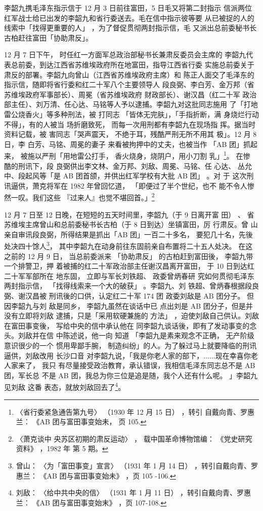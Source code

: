 李韶九携毛泽东指示信于 12 月 3 日前往富田，5 日毛又将第二封指示 信派两位
红军战士给已出发的李韶九和省行委送去。毛在信中指示彼等要 从已被捉的人的
线索中「找得更重要的人」 ，为了督促贯彻两封指示信，毛 又派出总前委秘书长
古柏赶往富田「协助肃反」。

12 月 7 日下午， 时任红一方面军总政治部秘书长兼肃反委员会主席的 李韶九代
表总前委，到达江西省苏维埃政府所在地富田，指导江西省行委 实施总前委关于
肃反的部署。李韶九向曾山（江西省苏维埃政府主席）和 陈正人面交了毛泽东的
指示信，随即将省行委和红二十军八个主要领导人 段良弼、李白芳、金万邦（省
苏维埃政府军事部长）、周冕（省苏维埃政府 财政部长）、谢汉昌（红二十军
政治部主任）、刘万清、任心达、马铭等人予以逮捕。李韶九对这批同志施用
了「打地雷公烧香火」等多种刑法，被 打同志 「皆体无完肤」，「手指折断，满
身烧烂行动不得」，有的人被当 场折磨致死， 而每一次用刑都有李韶九在现场指
挥。据当时资料记载，被 害同志「哭声震天， 不绝于耳，残酷严刑无所不用其
极」。12 月 8 日，李 白芳、马铭、周冕的妻子 来看被拘押中的丈夫，也被当作
「AB 团」抓起来， 被施以严刑「用地雷公打手， 香火烧身，烧阴户，用小刀割
乳」\footnote{ 〈省行委紧急通告第九号〉 （1930 年 12 月 15 日） ，转引
自戴向青、罗惠兰： 《AB 团与富田事变始未， 页 105.}。 在惨 酷的刑讯下，段
良弼供出李文林、金万邦、刘敌、周冕、马铭、任 心达、 丛允中、段起风等「是
AB 团首颌，并供出红军学校有大批 AB 团」 。对 于 这次刑讯逼供，萧克将军在
1982 年曾回忆道， 「即便过了半个世纪，也不 能不令人惨然一叹。我们这些
『过来人』也觉不堪回首。」\footnote{ 〈萧克谈中 央苏区初期的肃反运动〉 ，
载中国革命博物馆编： 《党史研究资料》 ，1982 年 第 5 期。}

12 月 7 日至 12 日晚，在短短的五天时间里，李韶九（于 9 日离开富 田） 、
省苏维埃主席曾山和总前委秘书长古柏（于 8 日到达）坐镇富田，厉 行肃反。曾
山亲自审讯段良弼，所得结果是抓出「AB 团」一百二十多名， 要犯几十名，先後
处决四十馀人\footnote{ 曾山： 〈为「富田事变」宣言〉 （1931 年 1 月
14 日） ，转引自戴向青、罗惠兰： 《AB 团与富田事变始未》 ，页 105 -106.}，
其中李韶九在动身前往东固前亲自布置将二十五人处决。 在这之前的 12 月 9
日， 当总前委派来 「协助肃反」 的古柏赶到富田後， 李韶九带一个排警卫，押
着被捕的红二十军政治部主任谢汉昌离开富田， 于 10 日到达红二十军军部所在
地东固， 立即与军长刘铁超、 政委曾炳春研 究如何贯彻毛泽东两封指示信，
「找得线索来一个大的破获」 。李韶九、刘 铁超、曾炳春根据段良弼、谢汉昌被
刑讯後的口供，认定红二十军 174 团 政委刘敌是 AB 团分子。 但因李韶九与刘
敌是同乡， 李韶九虽然在谈话中已 点出刘是 AB 团分子，但是并没有立即将刘敌
逮捕，只是「采用软硬兼施的 方法」 ，迫使刘敌自己供认。刘敌在富田事变後，
写给中央的信中承认他在 同李韶九谈话後，即有了发动事变的念头。刘敌并在信
中陈述说，他一向 知道 「李韶九是素来观念不正确， 无产阶级意识很少的一个
惯用卑鄙手腕， 制造纠纷」的人。为了躲过马上就要降临的刑讯逼供，刘敌改用
长沙口音 对李韶九说，「我是你老人家的部下，......现在幸喜你老人家来了，
我只 有尽量接受政治教育，承认错误，我相信毛泽东同志总不是 AB 团，军长总
不是 AB 团，我总为你三位是追是随，我个人还有什么呢。 」李韶九见刘敌 这番
表态，就放刘敌回去了\footnote{ 刘敌：
〈给中共中央的信〉
（1931 年 1 月 11 日）
，转引自戴向青、罗惠兰：
《AB 团与富田事变始末》
，页 107-108.}。

